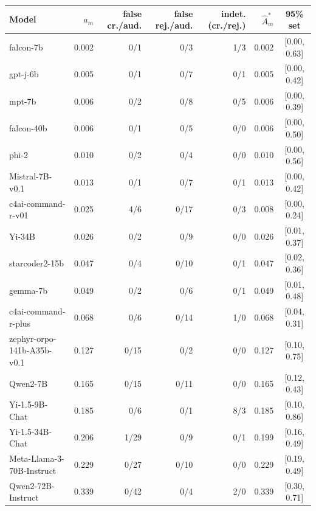 \begin{tabular}{@{}lrrrrrc@{}}
\toprule
Model & $a_m$ & false cr./aud. & false rej./aud. & indet. (cr./rej.) & $\hat A^\ast_m$ & 95\% set \\
\midrule
falcon-7b & 0.002 & 0/1 & 0/3 & 1/3 & 0.002 & [0.00, 0.63] \\
gpt-j-6b & 0.005 & 0/1 & 0/7 & 0/1 & 0.005 & [0.00, 0.42] \\
mpt-7b & 0.006 & 0/2 & 0/8 & 0/5 & 0.006 & [0.00, 0.39] \\
falcon-40b & 0.006 & 0/1 & 0/5 & 0/0 & 0.006 & [0.00, 0.50] \\
phi-2 & 0.010 & 0/2 & 0/4 & 0/0 & 0.010 & [0.00, 0.56] \\
Mistral-7B-v0.1 & 0.013 & 0/1 & 0/7 & 0/1 & 0.013 & [0.00, 0.42] \\
c4ai-command-r-v01 & 0.025 & 4/6 & 0/17 & 0/3 & 0.008 & [0.00, 0.24] \\
Yi-34B & 0.026 & 0/2 & 0/9 & 0/0 & 0.026 & [0.01, 0.37] \\
starcoder2-15b & 0.047 & 0/4 & 0/10 & 0/1 & 0.047 & [0.02, 0.36] \\
gemma-7b & 0.049 & 0/2 & 0/6 & 0/1 & 0.049 & [0.01, 0.48] \\
c4ai-command-r-plus & 0.068 & 0/6 & 0/14 & 1/0 & 0.068 & [0.04, 0.31] \\
zephyr-orpo-141b-A35b-v0.1 & 0.127 & 0/15 & 0/2 & 0/0 & 0.127 & [0.10, 0.75] \\
Qwen2-7B & 0.165 & 0/15 & 0/11 & 0/0 & 0.165 & [0.12, 0.43] \\
Yi-1.5-9B-Chat & 0.185 & 0/6 & 0/1 & 8/3 & 0.185 & [0.10, 0.86] \\
Yi-1.5-34B-Chat & 0.206 & 1/29 & 0/9 & 0/1 & 0.199 & [0.16, 0.49] \\
Meta-Llama-3-70B-Instruct & 0.229 & 0/27 & 0/10 & 0/0 & 0.229 & [0.19, 0.49] \\
Qwen2-72B-Instruct & 0.339 & 0/42 & 0/4 & 2/0 & 0.339 & [0.30, 0.71] \\
\bottomrule
\end{tabular}

